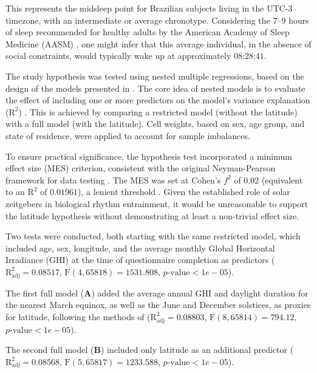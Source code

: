 \documentclass[
12pt,
openright,
oneside,
a4paper,
chapter=TITLE,
section=TITLE,
french,
spanish,
brazil,
english
]{abntex2}
\begin{document}
This represents the midsleep point for Brazilian subjects living in the
UTC-3 timezone, with an intermediate or average chronotype. Considering
the \(7–9\) hours of sleep recommended for healthy adults by the
American Academy of Sleep Medicine (AASM) \autocite{watson2015b}, one
might infer that this average individual, in the absence of social
constraints, would typically wake up at approximately
\(\text{08:28:41}\).

The study hypothesis was tested using nested multiple regressions, based
on the design of the models presented in \textcite{leocadio-miguel2017}.
The core idea of nested models is to evaluate the effect of including
one or more predictors on the model's variance explanation
(\(\text{R}^2\)) \autocite{maxwell2018}. This is achieved by comparing a
restricted model (without the latitude) with a full model (with the
latitude). Cell weights, based on sex, age group, and state of
residence, were applied to account for sample imbalances.

To ensure practical significance, the hypothesis test incorporated a
minimum effect size (MES) criterion, consistent with the original
Neyman-Pearson framework for data testing
\autocite{neyman1928,neyman1928a,perezgonzalez2015}. The MES was set at
Cohen's \(f^2\) of \(0.02\) (equivalent to an \(\text{R}^2\) of
\(0.01961\)), a lenient threshold \autocite{cohen1988a}. Given the
established role of solar zeitgebers in biological rhythm entrainment,
it would be unreasonable to support the latitude hypothesis without
demonstrating at least a non-trivial effect size.

Two tests were conducted, both starting with the same restricted model,
which included age, sex, longitude, and the average monthly Global
Horizontal Irradiance (GHI) at the time of questionnaire completion as
predictors (\(\text{R}^2_{\text{adj}} = 0.08517\),
\(\text{F}(4, 65818) = 1531.808\), \(p\text{-value} < 1e-05\)).

The first full model (\textbf{A}) added the average annual GHI and
daylight duration for the nearest March equinox, as well as the June and
December solstices, as proxies for latitude, following the methods of
\textcite{leocadio-miguel2017} (\(\text{R}^2_{\text{adj}} = 0.08803\),
\(\text{F}(8, 65814) = 794.12\), \(p\text{-value} < 1e-05\)).

The second full model (\textbf{B}) included only latitude as an
additional predictor (\(\text{R}^2_{\text{adj}} = 0.08568\),
\(\text{F}(5, 65817) = 1233.588\), \(p\text{-value} < 1e-05\)).
\end{document}
